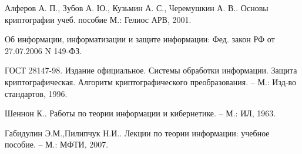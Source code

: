 ﻿\begin{thebibliography}{99}

 Алферов А. П., Зубов А. Ю., Кузьмин А. С., Черемушкин А. В.. Основы криптографии учеб. пособие М.: Гелиос АРВ, 2001.

Об информации, информатизации и защите информации: Фед. закон РФ  от 27.07.2006 N 149-ФЗ.

ГОСТ 28147-98. Издание официальное. Системы обработки информации. Защита криптографическая. Алгоритм криптографического преобразования. -- М.: Изд-во стандартов, 1996.

Шеннон К.. Работы по теории информации и кибернетике. -- М.: ИЛ, 1963.

Габидулин Э.М.,Пилипчук Н.И.. Лекции по теории информации: учебное пособие. -- М.: МФТИ, 2007.

\end{thebibliography}
